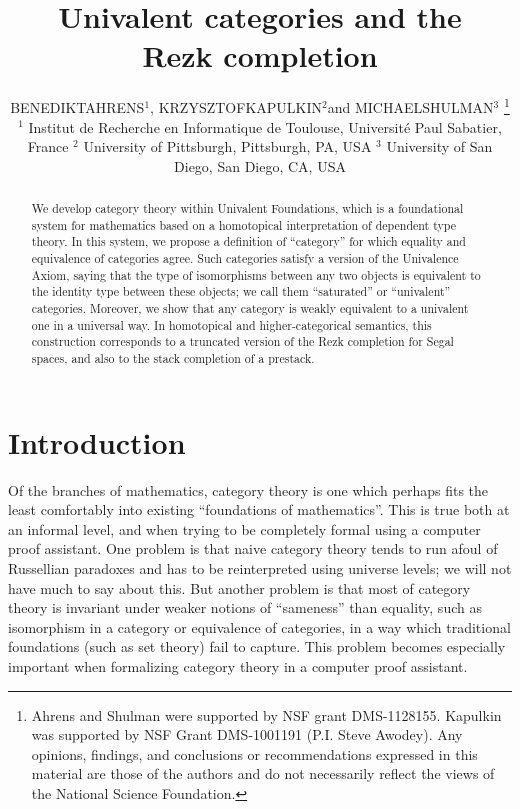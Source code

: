 \documentclass{mscs}
\numberwithin{equation}{section}
\begin{document}
\title[Univalent categories and the Rezk completion]
{Univalent categories and the \\ Rezk completion}
\author[B.\ Ahrens, K.\ Kapulkin and M.\ Shulman]
{B\ls E\ls N\ls E\ls D\ls I\ls K\ls T\ns A\ls H\ls R\ls E\ls N\ls S\ls$^1$,\ns
 K\ls R\ls Z\ls Y\ls S\ls Z\ls T\ls O\ls F\ns K\ls A\ls P\ls U\ls L\ls K\ls I\ls N$^2$\ns and\ns
  M\ls I\ls C\ls H\ls A\ls E\ls L\ns S\ls H\ls U\ls L\ls M\ls A\ls N$^3$%
\thanks{Ahrens and Shulman were supported by NSF grant DMS-1128155.
Kapulkin was supported by NSF Grant DMS-1001191 (P.I. Steve Awodey).
Any opinions, findings, and conclusions or recommendations expressed in this material are those of the authors and do not necessarily reflect the views of the National Science Foundation.}\\
$^1$ Institut de Recherche en Informatique de Toulouse, Universit\'e Paul Sabatier, France
\addressbreak $^2$ University of Pittsburgh, Pittsburgh, PA, USA
\addressbreak $^3$ University of San Diego, San Diego, CA, USA}

\maketitle

\begin{abstract}
  We develop category theory within Univalent Foundations, which is a foundational system for mathematics based on a homotopical interpretation of dependent type theory.
  In this system, we propose a definition of ``category'' for which equality and equivalence of categories agree.
  Such categories satisfy a version of the Univalence Axiom, saying that the type of isomorphisms between any two objects is equivalent to the identity type between these objects; we call them ``saturated'' or ``univalent'' categories.
  Moreover, we show that any category is weakly equivalent to a univalent one in a universal way.
  In homotopical and higher-categorical semantics, this construction corresponds to a truncated version of the Rezk completion for Segal spaces, and also to the stack completion of a prestack.
\end{abstract}



\section{Introduction}
\label{sec:introduction}

Of the branches of mathematics, category theory is one which perhaps fits the least comfortably into existing ``foundations of mathematics''.
This is true both at an informal level, and when trying to be completely formal using a computer proof assistant.
One problem is that naive category theory tends to run afoul of Russellian paradoxes and has to be reinterpreted using universe levels; we will not have much to say about this.
But another problem is that most of category theory is invariant under weaker notions of ``sameness'' than equality, such as isomorphism in a category or equivalence of categories, in a way which traditional foundations (such as set theory) fail to capture.
This problem becomes especially important when formalizing category theory in a computer proof assistant.
\end{document}
